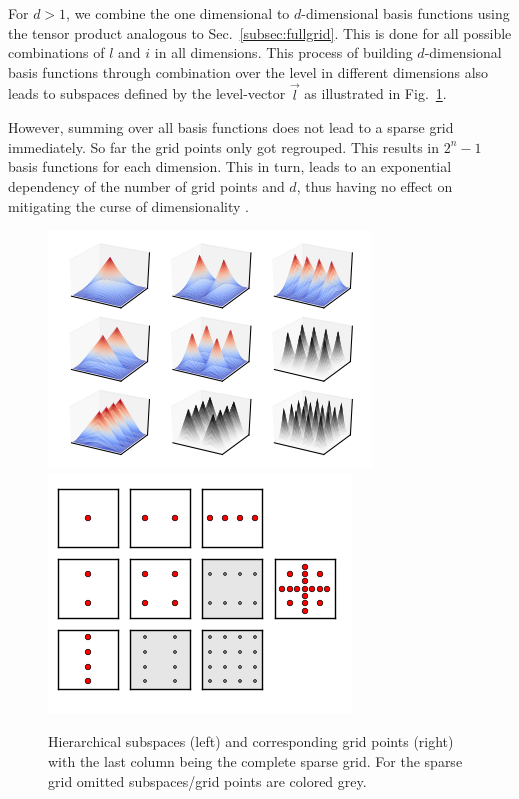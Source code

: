 For $d > 1$, we combine the one dimensional
to $d$-dimensional basis functions using the tensor product
analogous to Sec.~\ref{subsec:fullgrid}. This is done for all possible combinations
of $l$ and $i$ in all dimensions.
This process of building $d$-dimensional basis functions
through combination over the level in different dimensions also leads to
subspaces defined by the level-vector $\vec{l}$
as illustrated in Fig.~\ref{fig:fig2}.
\par
However, summing over all basis functions 
does not lead to a sparse grid immediately. So far the
grid points only got regrouped. This
results in $2^{n} - 1$ basis functions for each dimension.
This in turn, leads to an exponential dependency of the number of grid points
and $d$, thus having no effect on mitigating the curse of dimensionality
\cite{disspfl}.



\begin{figure}[t!]
  \centering
  \includegraphics{images/figure_2.png}
  \includegraphics{images/figure_3.png}
  \caption{Hierarchical subspaces (left) and corresponding grid points
    (right) with the last column being the complete sparse grid.
    For the sparse grid omitted subspaces/grid points are colored grey.
    \label{fig:fig2}}
\end{figure}

